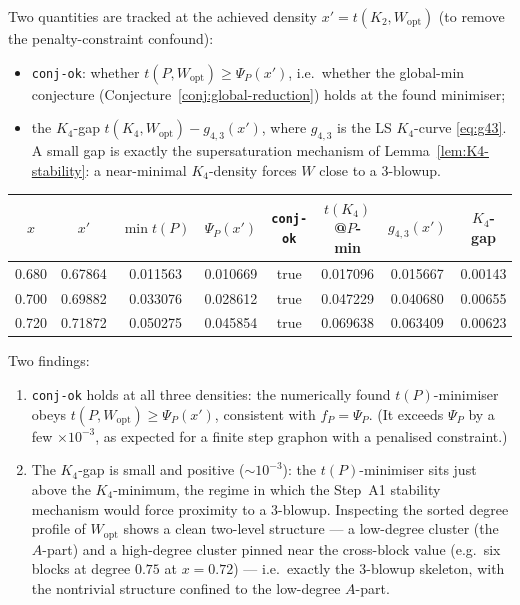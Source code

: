 \documentclass[11pt]{amsart}
\theoremstyle{definition}
\newcommand{\1}{\mathbf 1}
\begin{document}
Two quantities are tracked at the achieved density $x'=t(K_2,W_{\mathrm{opt}})$
(to remove the penalty-constraint confound):
\begin{itemize}[itemsep=2pt]
\item \texttt{conj-ok}: whether $t(P,W_{\mathrm{opt}})\ge\Psi_P(x')$, i.e.\
whether the global-min conjecture (Conjecture~\ref{conj:global-reduction}) holds
at the found minimiser;
\item the $K_4$-gap $t(K_4,W_{\mathrm{opt}})-g_{4,3}(x')$, where $g_{4,3}$ is the
LS $K_4$-curve \eqref{eq:g43}.  A small gap is exactly the supersaturation
mechanism of Lemma~\ref{lem:K4-stability}: a near-minimal $K_4$-density forces
$W$ close to a $3$-blowup.
\end{itemize}

\begin{center}
\begin{tabular}{c|c|c|c|c|c|c|c}
$x$ & $x'$ & $\min t(P)$ & $\Psi_P(x')$ & \texttt{conj-ok} & $t(K_4)$@$P$-min & $g_{4,3}(x')$ & $K_4$-gap \\ \hline
0.680 & 0.67864 & 0.011563 & 0.010669 & true & 0.017096 & 0.015667 & 0.00143 \\
0.700 & 0.69882 & 0.033076 & 0.028612 & true & 0.047229 & 0.040680 & 0.00655 \\
0.720 & 0.71872 & 0.050275 & 0.045854 & true & 0.069638 & 0.063409 & 0.00623 \\
\end{tabular}
\end{center}

Two findings:
\begin{enumerate}[label=(\arabic*),itemsep=3pt]
\item \texttt{conj-ok} holds at all three densities: the numerically found
$t(P)$-minimiser obeys $t(P,W_{\mathrm{opt}})\ge\Psi_P(x')$, consistent with
$f_P=\Psi_P$.  (It exceeds $\Psi_P$ by a few $\times10^{-3}$, as expected for a
finite step graphon with a penalised constraint.)
\item The $K_4$-gap is small and positive ($\sim10^{-3}$): the $t(P)$-minimiser
sits just above the $K_4$-minimum, the regime in which the Step~A1 stability
mechanism would force proximity to a $3$-blowup.  Inspecting the sorted degree
profile of $W_{\mathrm{opt}}$ shows a clean two-level structure --- a low-degree
cluster (the $A$-part) and a high-degree cluster pinned near the cross-block
value (e.g.\ six blocks at degree $0.75$ at $x=0.72$) --- i.e.\ exactly the
$3$-blowup skeleton, with the nontrivial structure confined to the low-degree
$A$-part.
\end{enumerate}
\end{document}
